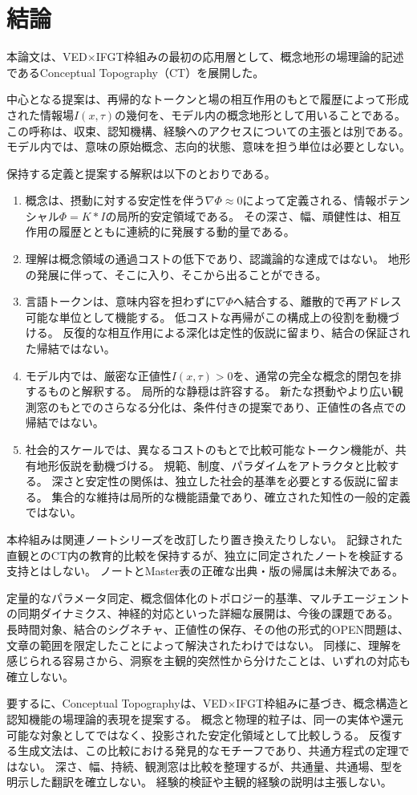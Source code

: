 \section{結論}
\label{sec:conclusion}

本論文は、VED$\times$IFGT枠組みの最初の応用層として、概念地形の場理論的記述であるConceptual Topography（CT）を展開した。

中心となる提案は、再帰的なトークンと場の相互作用のもとで履歴によって形成された情報場$I(x,\tau)$の幾何を、モデル内の概念地形として用いることである。
この呼称は、収束、認知機構、経験へのアクセスについての主張とは別である。
モデル内では、意味の原始概念、志向的状態、意味を担う単位は必要としない。

保持する定義と提案する解釈は以下のとおりである。
\begin{enumerate}
\item 概念は、摂動に対する安定性を伴う$\nabla\Phi\approx 0$によって定義される、情報ポテンシャル$\Phi = K*I$の局所的安定領域である。
その深さ、幅、頑健性は、相互作用の履歴とともに連続的に発展する動的量である。
\item 理解は概念領域の通過コストの低下であり、認識論的な達成ではない。
地形の発展に伴って、そこに入り、そこから出ることができる。
\item 言語トークンは、意味内容を担わずに$\nabla\Phi$へ結合する、離散的で再アドレス可能な単位として機能する。
低コストな再帰がこの構成上の役割を動機づける。
反復的な相互作用による深化は定性的仮説に留まり、結合の保証された帰結ではない。
\item モデル内では、厳密な正値性$I(x,\tau)>0$を、通常の完全な概念的閉包を排するものと解釈する。
局所的な静穏は許容する。
新たな摂動やより広い観測窓のもとでのさらなる分化は、条件付きの提案であり、正値性の各点での帰結ではない。
\item 社会的スケールでは、異なるコストのもとで比較可能なトークン機能が、共有地形仮説を動機づける。
規範、制度、パラダイムをアトラクタと比較する。
深さと安定性の関係は、独立した社会的基準を必要とする仮説に留まる。
集合的な維持は局所的な機能語彙であり、確立された知性の一般的定義ではない。
\end{enumerate}

本枠組みは関連ノートシリーズを改訂したり置き換えたりしない。
記録された直観とのCT内の教育的比較を保持するが、独立に同定されたノートを検証する支持とはしない。
ノートとMaster表の正確な出典・版の帰属は未解決である。

定量的なパラメータ同定、概念個体化のトポロジー的基準、マルチエージェントの同期ダイナミクス、神経的対応といった詳細な展開は、今後の課題である。
長時間対象、結合のシグネチャ、正値性の保存、その他の形式的OPEN問題は、文章の範囲を限定したことによって解決されたわけではない。
同様に、理解を感じられる容易さから、洞察を主観的突然性から分けたことは、いずれの対応も確立しない。

要するに、Conceptual Topographyは、VED$\times$IFGT枠組みに基づき、概念構造と認知機能の場理論的表現を提案する。
概念と物理的粒子は、同一の実体や還元可能な対象としてではなく、投影された安定化領域として比較しうる。
反復する生成文法は、この比較における発見的なモチーフであり、共通方程式の定理ではない。
深さ、幅、持続、観測窓は比較を整理するが、共通量、共通場、型を明示した翻訳を確立しない。
経験的検証や主観的経験の説明は主張しない。
